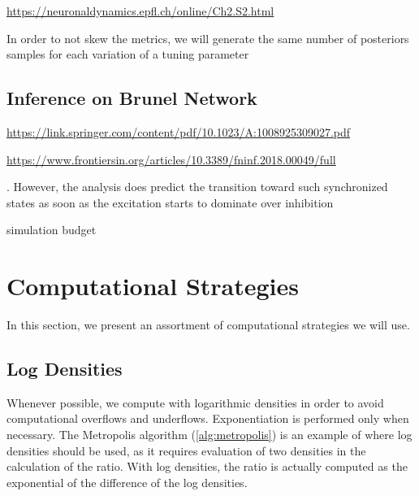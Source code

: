 \url{https://neuronaldynamics.epfl.ch/online/Ch2.S2.html}


In order to not skew the metrics, we will generate the same number of posteriors samples for each variation of a tuning parameter 

\subsection{Inference on Brunel Network}


\url{https://link.springer.com/content/pdf/10.1023/A:1008925309027.pdf}

\url{https://www.frontiersin.org/articles/10.3389/fninf.2018.00049/full}

. However, the analysis does predict the transition
toward such synchronized states as soon as the excitation starts to dominate over inhibition

simulation budget

\section{Computational Strategies}

In this section, we present an assortment of computational strategies we will use. 



\subsection{Log Densities}

Whenever possible, we compute with logarithmic densities in order to avoid computational overflows and underflows. Exponentiation is performed only when necessary. The Metropolis algorithm (\cref{alg:metropolis}) is an example of where log densities should be used, as it requires evaluation of two densities in the calculation of the ratio. With log densities, the ratio is actually computed as the exponential of the difference of the log densities.   


